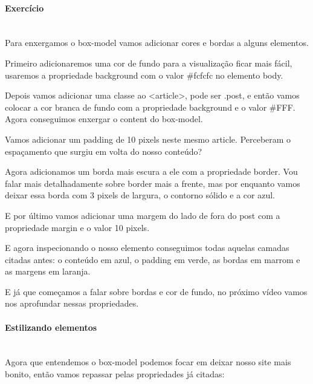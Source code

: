 \documentclass[12pt,a4paper]{article}
\begin{document}
	\paragraph{Exercício} \mbox{} \\
	
	Para enxergamos o box-model vamos adicionar cores e bordas a alguns elementos.
	
	Primeiro adicionaremos uma cor de fundo para a visualização ficar mais fácil, usaremos a propriedade background com o valor \#fcfcfc no elemento body.
	
	Depois vamos adicionar uma classe ao <article>, pode ser .post, e então vamos colocar a cor branca de fundo com a propriedade background e o valor \#FFF. Agora conseguimos enxergar o content do box-model.
	
	Vamos adicionar um padding de 10 pixels neste mesmo article. Perceberam o espaçamento que surgiu em volta do nosso conteúdo?
	
	Agora adicionamos um borda mais escura a ele com a propriedade border. Vou falar mais detalhadamente sobre border mais a frente, mas por enquanto vamos deixar essa borda com 3 pixels de largura, o contorno sólido e a cor azul.
	
	E por último vamos adicionar uma margem do lado de fora do post com a propriedade margin e o valor 10 pixels.
	
	E agora inspecionando o nosso elemento conseguimos todas aquelas camadas citadas antes: o conteúdo em azul, o padding em verde, as bordas em marrom e as margens em laranja.
	
	E já que começamos a falar sobre bordas e cor de fundo, no próximo vídeo vamos nos aprofundar nessas propriedades.
	
	\paragraph{Estilizando elementos} \mbox{} \\
	
	Agora que entendemos o box-model podemos focar em deixar nosso site mais bonito, então vamos repassar pelas propriedades já citadas:
	
\end{document}
